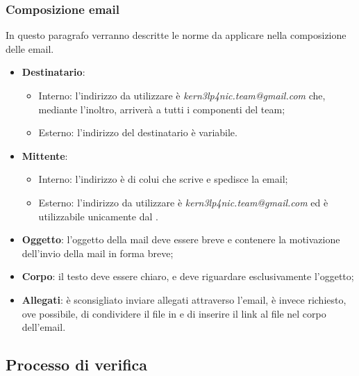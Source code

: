 \documentclass[../NormeDiProgetto.tex]{subfiles}
\begin{document}
\subsubsection{Composizione email}
In questo paragrafo verranno descritte le norme da applicare nella
composizione delle email.
\begin{itemize}
	\item \textbf{Destinatario}:
	\begin{itemize}
  		\item Interno: l'indirizzo da utilizzare è \textit{kern3lp4nic.team@gmail.com} che, mediante l'inoltro, arriverà a tutti i componenti del team;
  		\item Esterno: l'indirizzo del destinatario è variabile.
	\end{itemize}
	\item \textbf{Mittente}:
	\begin{itemize}
  		\item Interno: l'indirizzo è di colui che scrive e spedisce la email;
  		\item Esterno: l'indirizzo da utilizzare è \textit{kern3lp4nic.team@gmail.com} ed è utilizzabile unicamente dal \responsabilediprogetto.
	\end{itemize}
	\item \textbf{Oggetto}: l'oggetto della mail deve essere breve e contenere la motivazione dell'invio della mail in forma breve;
	\item \textbf{Corpo}: il testo deve essere chiaro, e deve riguardare esclusivamente l'oggetto;
	\item \textbf{Allegati}: è sconsigliato inviare allegati attraverso l'email, è invece richiesto, ove possibile, di condividere il file in  e di inserire il link al file nel corpo dell'email.
\end{itemize}

\subsection{Processo di verifica}
\end{document}
